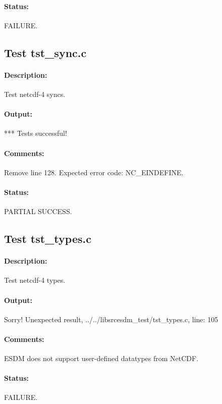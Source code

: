 \paragraph{Status:} FAILURE.

\subsection{Test tst\_sync.c}

\paragraph{Description:} Test netcdf-4 syncs.

\paragraph{Output:} *** Tests successful!

\paragraph{Comments:} Remove line 128. Expected error code: NC\_EINDEFINE.

\paragraph{Status:} PARTIAL SUCCESS.

\subsection{Test tst\_types.c}

\paragraph{Description:} Test netcdf-4 types.

\paragraph{Output:} Sorry! Unexpected result, ../../libsrcesdm\_test/tst\_types.c, line: 105

\paragraph{Comments:} ESDM does not support user-defined datatypes from NetCDF.

\paragraph{Status:} FAILURE.

